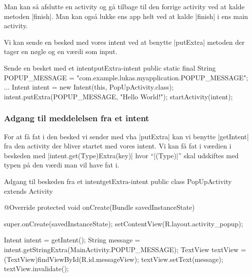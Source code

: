 Man kan så afslutte en activity og gå tilbage til den forrige activity ved at kalde metoden \JavaInline|finish|. Man kan også lukke ens app helt ved at kalde \JavaInline|finish| i ens main activity.

Vi kan sende en besked med vores intent ved at benytte \JavaInline|putExtra| metoden der tager en nøgle og en værdi som input.

\begin{JavaCode}{Sende en besket med et intent}{putExtra-intent}
	public static final String POPUP_MESSAGE = "com.example.lukas.myapplication.POPUP_MESSAGE";
	...
	Intent intent = new Intent(this, PopUpActivity.class);
	intent.putExtra(POPUP_MESSAGE, "Hello World!");
	startActivity(intent);
\end{JavaCode}

\subsubsection{Adgang til meddelelsen fra et intent}

For at få fat i den besked vi sender med vha \JavaInline|putExtra| kan vi benytte \JavaInline|getIntent| fra den activity der bliver startet med vores intent. Vi kan få fat i værdien i beskeden med \JavaInline|intent.get(Type)Extra(key)|  hvor ``\JavaInline|(Type)|'' skal udskiftes med typen på den værdi man vil have fat i.

\begin{JavaCode}{Adgang til beskeden fra et intent}{getExtra-intent}
	public class PopUpActivity extends Activity {
		
		@Override
		protected void onCreate(Bundle savedInstanceState) {
			super.onCreate(savedInstanceState);
			setContentView(R.layout.activity_popup);
			
			Intent intent = getIntent();
			String message = intent.getStringExtra(MainActivity.POPUP_MESSAGE);
			TextView textView = (TextView)findViewById(R.id.messageView);
			textView.setText(message);
			textView.invalidate();
		}
	}
\end{JavaCode}

